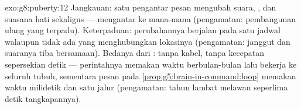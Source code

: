 \begin{solution}{exo:g8:puberty:12}
Jangkauan: satu pengantar pesan mengubah suara, , 
dan suasana hati sekaligus ---  mengantar ke
mana-mana (pengamatan: pembangunan ulang yang terpadu).
Keterpaduan: perubahannya berjalan pada satu jadwal walaupun
tidak ada  yang menghubungkan lokasinya (pengamatan:
janggut dan suaranya tiba bersamaan). Bedanya dari :
tanpa kabel, tanpa kecepatan sepersekian detik --- perintahnya
memakan waktu berbulan-bulan lalu bekerja ke seluruh tubuh,
sementara pesan pada \cref{prop:g5:brain-in-command:loop}
memakan waktu milidetik dan satu jalur (pengamatan: tahun
lambat  melawan seperlima detik tangkapannya).
\end{solution}

